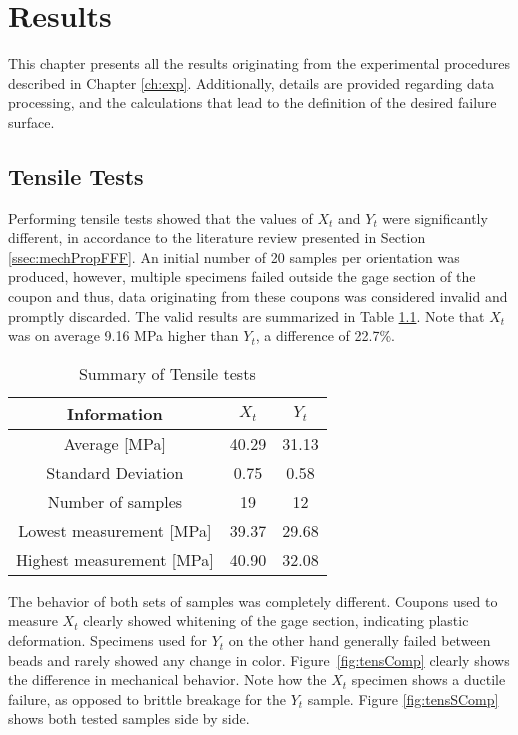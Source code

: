 \documentclass[main.tex]{subfiles}
\begin{document}
\chapter{Results} \label{ch:res}

This chapter presents all the results originating from the experimental procedures described in Chapter \ref{ch:exp}. Additionally, details are provided regarding data processing, and the calculations that lead to the definition of the desired failure surface. 

\section{Tensile Tests} \label{sec:tensr}
Performing tensile tests showed that the values of $X_t$ and $Y_t$ were significantly different, in accordance to the literature review presented in Section \ref{ssec:mechPropFFF}. An initial number of 20 samples per orientation was produced, however, multiple specimens failed outside the gage section of the coupon and thus, data originating from these coupons was considered invalid and promptly discarded. The valid results are summarized in Table \ref{tab:tensrtab}. Note that $X_t$ was on average 9.16 MPa higher than $Y_t$, a difference of 22.7\%.
\begin{table} [h]
	\centering
	\caption{Summary of Tensile tests}
\begin{tabular}{ c| c c } 
	\toprule
	\textbf{Information} & $X_t$ & $Y_t$\\
	\midrule
	Average [MPa] & 40.29 & 31.13\\
	Standard Deviation & 0.75 & 0.58\\
	Number of samples & 19 & 12\\
	Lowest measurement [MPa] &39.37  & 29.68\\
	Highest measurement [MPa] &40.90 & 32.08\\
	\bottomrule
\end{tabular}
\label{tab:tensrtab}
\end{table}

The behavior of both sets of samples was completely different. Coupons used to measure $X_t$ clearly showed whitening of the gage section, indicating plastic deformation. Specimens used for $Y_t$ on the other hand generally failed between beads and rarely showed any change in color. Figure~\ref{fig:tensComp} clearly shows the difference in mechanical behavior. Note how the $X_t$ specimen shows a ductile failure, as opposed to brittle breakage for the $Y_t$ sample. Figure \ref{fig:tensSComp} shows both tested samples side by side.
\pagebreak
\end{document}

